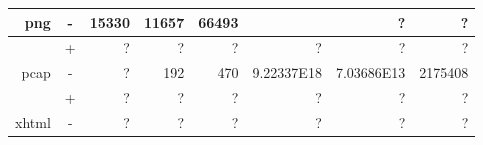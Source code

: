\begin{table}[H]
\begin{tabular}{|r|c|r|r|r|r|r|r|}
\multirow{-2}{*}{png}          & \cellcolor[HTML]{C0C0C0}-                                                   & \cellcolor[HTML]{C0C0C0} 15330                                              & \cellcolor[HTML]{C0C0C0} 11657                                                & \cellcolor[HTML]{C0C0C0} 66493                                               & \cellcolor[HTML]{C0C0C0}                                                     & \cellcolor[HTML]{C0C0C0}              ?                                         & \cellcolor[HTML]{C0C0C0}    ?                                                  \\ \hline \hline
                               & +                                                                           &              ?                                                              &                             ?                                                 &                                ?                                             &                                         ?                                    &                                        ?                                        &                                 ?                                              \\ \cline{2-8} 
\multirow{-2}{*}{pcap}         & \cellcolor[HTML]{C0C0C0}-                                                   & \cellcolor[HTML]{C0C0C0} ?                                                  & \cellcolor[HTML]{C0C0C0} 192                                                  & \cellcolor[HTML]{C0C0C0} 470                                                 & \cellcolor[HTML]{C0C0C0} 9.22337E18                                          & \cellcolor[HTML]{C0C0C0} 7.03686E13                                             & \cellcolor[HTML]{C0C0C0} 2175408                                               \\ \hline \hline
                               & +                                                                           &       ?                                                                     &                              ?                                                &                                 ?                                            &                                        ?                                     &                                         ?                                       &                                      ?                                         \\ \cline{2-8} 
\multirow{-2}{*}{xhtml}        & \cellcolor[HTML]{C0C0C0}-                                                   & \cellcolor[HTML]{C0C0C0}    ?                                               & \cellcolor[HTML]{C0C0C0} ?                                                    & \cellcolor[HTML]{C0C0C0}  ?                                                  & \cellcolor[HTML]{C0C0C0}    ?                                                & \cellcolor[HTML]{C0C0C0}  ?                                                     & \cellcolor[HTML]{C0C0C0}   ?                                                   \\ \hline

\end{tabular}
\end{table}
